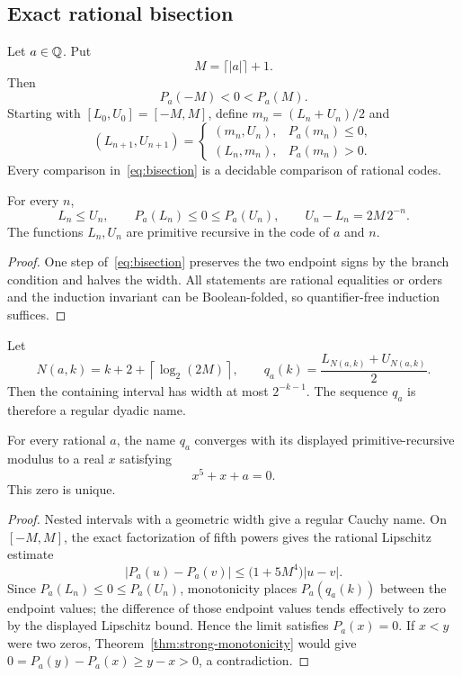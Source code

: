 \subsection{Exact rational bisection}

Let \(a\in\mathbb Q\).  Put
\[
 M=\lceil |a|\rceil+1.
\]
Then
\[
 P_a(-M)<0<P_a(M).
\]
Starting with \([L_0,U_0]=[-M,M]\), define
\(m_n=(L_n+U_n)/2\) and
\begin{equation}\label{eq:bisection}
 (L_{n+1},U_{n+1})=
 \begin{cases}
   (m_n,U_n),&P_a(m_n)\le0,\\
   (L_n,m_n),&P_a(m_n)>0.
 \end{cases}
\end{equation}
Every comparison in~\eqref{eq:bisection} is a decidable comparison of rational
codes.

\begin{lemma}\label{lem:bisection-invariant}
For every \(n\),
\[
 L_n\le U_n,
 \qquad P_a(L_n)\le0\le P_a(U_n),
 \qquad U_n-L_n=2M\,2^{-n}.
\]
The functions \(L_n,U_n\) are primitive recursive in the code of \(a\) and
\(n\).
\end{lemma}

\begin{proof}
One step of~\eqref{eq:bisection} preserves the two endpoint signs by the branch
condition and halves the width.  All statements are rational equalities or
orders and the induction invariant can be Boolean-folded, so quantifier-free
induction suffices.
\end{proof}

Let
\[
 N(a,k)=k+2+\left\lceil\log_2(2M)\right\rceil,
 \qquad
 q_a(k)=\frac{L_{N(a,k)}+U_{N(a,k)}}2.
\]
Then the containing interval has width at most \(2^{-k-1}\).  The sequence
\(q_a\) is therefore a regular dyadic name.

\begin{theorem}\label{thm:bring-exists}
For every rational \(a\), the name \(q_a\) converges with its displayed
primitive-recursive modulus to a real \(x\) satisfying
\[
 x^5+x+a=0.
\]
This zero is unique.
\end{theorem}

\begin{proof}
Nested intervals with a geometric width give a regular Cauchy name.  On
\([-M,M]\), the exact factorization of fifth powers gives the rational
Lipschitz estimate
\[
 |P_a(u)-P_a(v)|
 \le \bigl(1+5M^4\bigr)|u-v|.
\]
Since \(P_a(L_n)\le0\le P_a(U_n)\), monotonicity places
\(P_a(q_a(k))\) between the endpoint values; the difference of those endpoint
values tends effectively to zero by the displayed Lipschitz bound.  Hence the
limit satisfies \(P_a(x)=0\).  If \(x<y\) were two zeros,
Theorem~\ref{thm:strong-monotonicity} would give
\(0=P_a(y)-P_a(x)\ge y-x>0\), a contradiction.
\end{proof}

